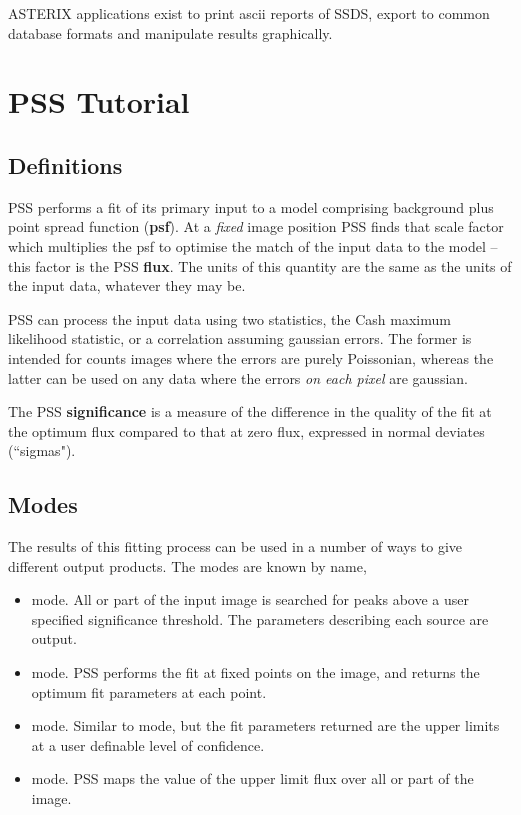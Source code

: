 ASTERIX applications exist to print ascii reports of SSDS, export to
common database formats and manipulate results graphically.


\newpage
\section{PSS Tutorial}
\label{pss:tut}

\subsection{Definitions}
PSS performs a fit of its primary input to a model comprising
background plus point spread function ({\bf psf}). At a {\em fixed} 
image position PSS finds that scale factor which multiplies the psf
to optimise the
match of the input data to the model -- this factor is the PSS {\bf flux}.
The units of this quantity are the same as the units of the input data,
whatever they may be. 

PSS can process the input data using two statistics, the Cash maximum
likelihood statistic, or a correlation assuming gaussian errors. The
former is intended for counts images where the errors are purely
Poissonian, whereas the latter can be used on any data where the errors
{\em on each pixel} are gaussian.

The PSS {\bf significance} is a measure of the difference in the quality
of the fit at the optimum flux compared to that at zero flux, expressed
in normal deviates (``sigmas").

\subsection{Modes}
The results of this fitting process can be used in a number of ways
to give different output products. The modes are known by name,

\begin{itemize}
\item {} mode. All or part of the input image is searched
for peaks above a user specified significance threshold. The parameters
describing each source are output.
\item {} mode. PSS performs the fit at fixed points
on the image, and returns the optimum fit parameters at each point.
\item {} mode. Similar to  mode, but 
the fit parameters returned are the upper limits at a user definable
level of confidence.
\item {} mode. PSS maps the value of the upper limit flux
over all or part of the image.
\end{itemize}

